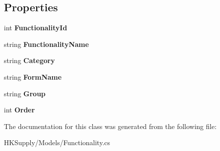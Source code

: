 \subsection*{Properties}
\begin{DoxyCompactItemize}
\item 
\mbox{\label{class_h_k_supply_1_1_models_1_1_functionality_a1d4863a80797dc71a680cdfb1981622f}} 
int {\bfseries Functionality\+Id}
\item 
\mbox{\label{class_h_k_supply_1_1_models_1_1_functionality_ab33c1a395b442de1c096c8beb00ab968}} 
string {\bfseries Functionality\+Name}
\item 
\mbox{\label{class_h_k_supply_1_1_models_1_1_functionality_a435984473f4cb370eab0a72efa561c1a}} 
string {\bfseries Category}
\item 
\mbox{\label{class_h_k_supply_1_1_models_1_1_functionality_a23ca4563c106add51c24a2741bf946a1}} 
string {\bfseries Form\+Name}
\item 
\mbox{\label{class_h_k_supply_1_1_models_1_1_functionality_aa12a2765ba6275844c9c135bdbfe6cd2}} 
string {\bfseries Group}
\item 
\mbox{\label{class_h_k_supply_1_1_models_1_1_functionality_a4547b3bf1cf9c30e879c8fba62514443}} 
int {\bfseries Order}
\end{DoxyCompactItemize}


The documentation for this class was generated from the following file\+:\begin{DoxyCompactItemize}
\item 
H\+K\+Supply/\+Models/Functionality.\+cs\end{DoxyCompactItemize}
